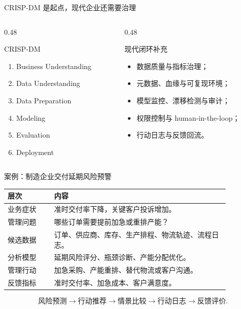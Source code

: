 \documentclass[UTF8,fontset=fandol,aspectratio=169,11pt]{ctexbeamer}
\begin{document}
\begin{frame}{CRISP-DM 是起点，现代企业还需要治理}
\begin{columns}[T]
\begin{column}{0.48\linewidth}
\begin{block}{CRISP-DM}
\begin{enumerate}
  \item Business Understanding
  \item Data Understanding
  \item Data Preparation
  \item Modeling
  \item Evaluation
  \item Deployment
\end{enumerate}
\end{block}
\end{column}
\begin{column}{0.48\linewidth}
\begin{block}{现代闭环补充}
\begin{itemize}
  \item 数据质量与指标治理；
  \item 元数据、血缘与可复现环境；
  \item 模型监控、漂移检测与审计；
  \item 权限控制与 human-in-the-loop；
  \item 行动日志与反馈回流。
\end{itemize}
\end{block}
\end{column}
\end{columns}
\end{frame}

\begin{frame}{案例：制造企业交付延期风险预警}
\begin{table}
\small
\centering
\begin{tabular}{p{0.18\linewidth}p{0.68\linewidth}}
\toprule
层次 & 内容\\
\midrule
业务症状 & 准时交付率下降，关键客户投诉增加。\\
管理问题 & 哪些订单需要提前加急或重排产能？\\
候选数据 & 订单、供应商、库存、生产排程、物流轨迹、流程日志。\\
分析模型 & 延期风险评分、瓶颈诊断、产能分配优化。\\
管理行动 & 加急采购、产能重排、替代物流或客户沟通。\\
反馈指标 & 准时交付率、加急成本、客户满意度。\\
\bottomrule
\end{tabular}
\end{table}

\[
\text{风险预测}\rightarrow\text{行动推荐}\rightarrow\text{情景比较}\rightarrow\text{行动日志}\rightarrow\text{反馈评价}.
\]
\end{frame}
\end{document}
